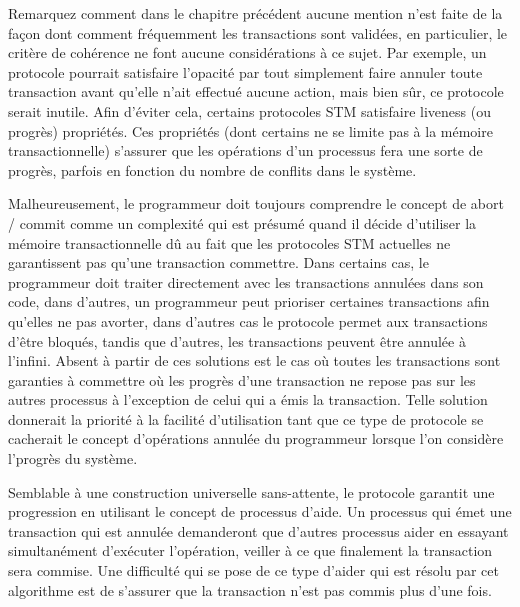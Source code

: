 Remarquez comment dans le chapitre précédent aucune mention n'est faite de la façon dont comment fréquemment les transactions sont validées, en particulier, le critère de cohérence ne font aucune considérations à ce sujet.
Par exemple, un protocole pourrait satisfaire l'opacité par tout simplement faire annuler toute transaction avant qu'elle n'ait effectué aucune action, mais bien sûr, ce protocole serait inutile.
Afin d'éviter cela, certains protocoles STM satisfaire liveness (ou progrès) propriétés.
Ces propriétés (dont certains ne se limite pas à la mémoire transactionnelle) s'assurer que les opérations d'un processus fera une sorte de progrès, parfois en fonction du nombre de conflits dans le système.






Malheureusement, le programmeur doit toujours comprendre le concept de abort / commit comme un complexité qui
est présumé quand il décide d'utiliser la mémoire transactionnelle dû au fait que les protocoles STM actuelles ne garantissent pas qu'une transaction commettre.
Dans certains cas, le programmeur doit traiter directement avec les transactions annulées dans son code,
dans d'autres, un programmeur peut prioriser certaines transactions afin qu'elles ne pas avorter, dans d'autres cas le protocole permet aux transactions d'être bloqués,
tandis que d'autres, les transactions peuvent être annulée à l'infini.
Absent à partir de ces solutions est le cas où toutes les transactions sont garanties à commettre où les
progrès d'une transaction ne repose pas sur les autres processus à l'exception de celui qui a émis la transaction.
Telle solution donnerait la priorité à la facilité d'utilisation tant que ce type de protocole se cacherait le concept d'opérations annulée du programmeur lorsque l'on considère l'progrès du système.



Semblable à une construction universelle sans-attente, le protocole garantit une progression en utilisant le concept de processus d'aide.
Un processus qui émet une transaction qui est annulée demanderont que d'autres processus aider en essayant simultanément d'exécuter l'opération, veiller à ce que finalement la transaction sera commise.
Une difficulté qui se pose de ce type d'aider qui est résolu par cet algorithme est de s'assurer que la transaction n'est pas commis plus d'une fois.



